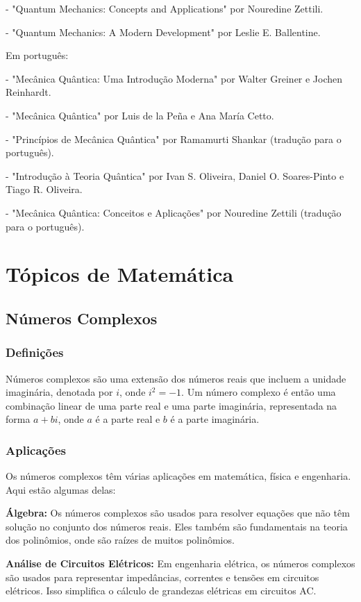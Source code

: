 \documentclass[12pt]{article}
\begin{document}
- "Quantum Mechanics: Concepts and Applications" por Nouredine Zettili.

- "Quantum Mechanics: A Modern Development" por Leslie E. Ballentine.

Em português:

- "Mecânica Quântica: Uma Introdução Moderna" por Walter Greiner e Jochen Reinhardt.

- "Mecânica Quântica" por Luis de la Peña e Ana María Cetto.

- "Princípios de Mecânica Quântica" por Ramamurti Shankar (tradução para o português).

- "Introdução à Teoria Quântica" por Ivan S. Oliveira, Daniel O. Soares-Pinto e Tiago R. Oliveira.

- "Mecânica Quântica: Conceitos e Aplicações" por Nouredine Zettili (tradução para o português).

\section{Tópicos de Matemática}

\subsection{Números Complexos}

\subsubsection{Definições}

Números complexos são uma extensão dos números reais que incluem a unidade imaginária, denotada por $i$, onde $i^2 = -1$. Um número complexo é então uma combinação linear de uma parte real e uma parte imaginária, representada na forma $a + bi$, onde $a$ é a parte real e $b$ é a parte imaginária.

\subsubsection{Aplicações}

Os números complexos têm várias aplicações em matemática, física e engenharia. Aqui estão algumas delas:

\textbf{Álgebra:} Os números complexos são usados para resolver equações que não têm solução no conjunto dos números reais. Eles também são fundamentais na teoria dos polinômios, onde são raízes de muitos polinômios.

\textbf{Análise de Circuitos Elétricos:} Em engenharia elétrica, os números complexos são usados para representar impedâncias, correntes e tensões em circuitos elétricos. Isso simplifica o cálculo de grandezas elétricas em circuitos AC.
\end{document}
